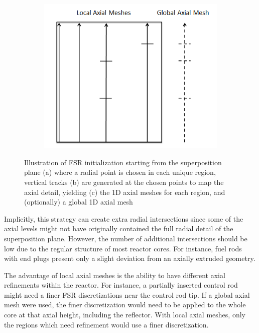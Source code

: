 \begin{figure}[h!]
\begin{subfigure}[b]{0.28\textwidth}
		\caption{}
		\label{fig:fsr-init-b}
	\end{subfigure}
	\begin{subfigure}[b]{0.4\textwidth}
		\centering
		\includegraphics[width=\linewidth]{figures/ph2016/fsr-init-c.PNG}
		\caption{}
		\label{fig:fsr-init-c}
	\end{subfigure}
	\caption[]{Illustration of FSR initialization starting from the superposition plane (a) where a radial point is chosen in each unique region, vertical tracks (b) are generated at the chosen points to map the axial detail, yielding (c) the 1D axial meshes for each region, and (optionally) a global 1D axial mesh}
	\label{fig:fsr-initialization}
\end{figure}

Implicitly, this strategy can create extra radial intersections since some of the axial levels might not have originally contained the full radial detail of the superposition plane. However, the number of additional intersections should be low due to the regular structure of most reactor cores. For instance, fuel rods with end plugs present only a slight deviation from an axially extruded geometry.

The advantage of local axial meshes is the ability to have different axial refinements within the reactor. For instance, a partially inserted control rod might need a finer FSR discretizations near the control rod tip. If a global axial mesh were used, the finer discretization would need to be applied to the whole core at that axial height, including the reflector. With local axial meshes, only the regions which need refinement would use a finer discretization.

